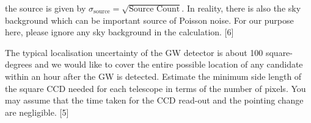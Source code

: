 \begin{description}
  the source is given by
  $\sigma_{\mathrm{source}} = \sqrt{\text{Source Count}}$. In reality, there is
  also the sky background which can be important source of Poisson noise. For
  our purpose here, please ignore any sky background in the calculation.
  \hfill[6]
\item[d)] The typical localisation uncertainty of the GW detector is about 100
  square-degrees and we would like to cover the entire possible location of any
  candidate within an hour after the GW is detected. Estimate the minimum side
  length of the square CCD needed for each telescope in terms of the number of
  pixels. You may assume that the time taken for the CCD read-out and the
  pointing change are negligible. \hfill[5]
\end{description}
